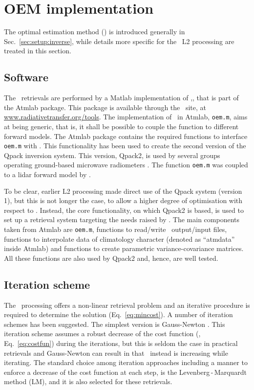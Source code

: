 \chapter{OEM implementation}
\label{chapter:oem}

The optimal estimation method (\OEM) is introduced generally in
Sec.~\ref{sec:setup:inverse}, while details more specific for the \smr\ L2
processing are treated in this section.

\section{Software}
\label{sec:oem.m}
%
The \smr\ retrievals are performed by a Matlab implementation of \OEM,, that is
part of the Atmlab package. This package is available through the \ARTS\ site,
at \url{www.radiativetransfer.org/tools}. The implementation of \OEM\ in Atmlab,
\texttt{oem.m}, aims at being generic, that is, it shall be possible to couple
the function to different forward models. The Atmlab package contains the
required functions to interface \texttt{oem.m} with \ARTS. This functionality
has been used to create the second version of the Qpack
\citep{eriksson:qpack:05} inversion system. This version, Qpack2, is used by
several groups operating ground-based microwave radiometers
\citep[e.g.][]{acp-15-5099-2015}. The function \texttt{oem.m} was coupled to a lidar
forward model by \citet{sica2015retrieval}.

To be clear, earlier L2 processing made direct use of the Qpack system (version
1), but this is not longer the case, to allow a higher degree of optimisation
with respect to \smr. Instead, the core functionality, on which Qpack2 is
based, is used to set up a retrieval system targeting the needs raised by \smr.
The main components taken from Atmlab are \texttt{oem.m}, functions to
read/write \ARTS\ output/input files, functions to interpolate data of
climatology character (denoted as ``atmdata'' inside Atmlab) and functions to
create parametric variance-covariance matrices. All these functions are also
used by Qpack2 and, hence, are well tested.


\section{Iteration scheme}
\label{sec:ml}
%
The \smr\ processing offers a non-linear retrieval problem and an iterative
procedure is required to determine the solution (Eq.~\ref{eq:mincost}). A
number of iteration schemes has been suggested. The simplest version is
Gauss-Newton \citep[see][Sec.~5.3]{rodgers:00}. This iteration scheme assumes a
robust decrease of the cost function (\CstFnc, Eq.~\ref{eq:costfun}) during the
iterations, but this is seldom the case in practical retrievals and
Gauss-Newton can result in that \CstFnc\ instead is increasing while iterating.
The standard choice among iteration approaches including a manner to enforce a
decrease of the cost function at each step, is the Levenberg\,-\,Marquardt
method (LM), and it is also selected for these retrievals.

